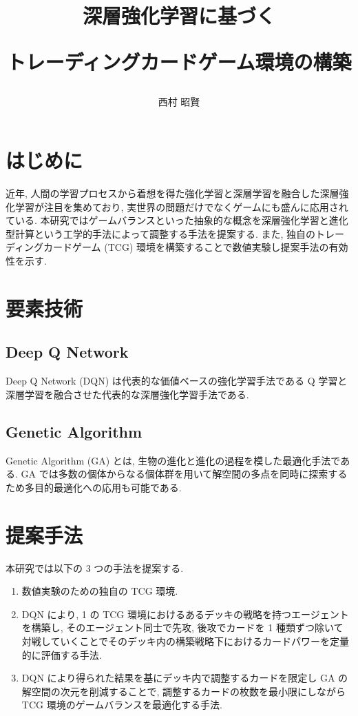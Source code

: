 \documentclass[a4paper,twoside,twocolumn,10pt]{article}
\title{深層強化学習に基づく
\par
トレーディングカードゲーム環境の構築}
\author{西村 昭賢}
\begin{document}
\maketitle %
\small

\section{はじめに}
近年, 人間の学習プロセスから着想を得た強化学習と深層学習を融合した深層強化学習が注目を集めており, 実世界の問題だけでなくゲームにも盛んに応用されている.
本研究ではゲームバランスといった抽象的な概念を深層強化学習と進化型計算という工学的手法によって調整する手法を提案する. また, 独自のトレーディングカードゲーム (TCG) 環境を構築することで数値実験し提案手法の有効性を示す.

\section{要素技術}
\subsection{Deep Q Network}
Deep Q Network (DQN) \cite{DQN} は代表的な価値ベースの強化学習手法である Q 学習と深層学習を融合させた代表的な深層強化学習手法である.

\subsection{Genetic Algorithm}
Genetic Algorithm (GA) とは, 生物の進化と進化の過程を模した最適化手法である. GA では多数の個体からなる個体群を用いて解空間の多点を同時に探索するため多目的最適化への応用も可能である. 
\section{提案手法}
本研究では以下の 3 つの手法を提案する.
\begin{enumerate}
  \setlength{\itemsep}{0cm} %
  \item 数値実験のための独自の TCG 環境.
  \item DQN により, 1 の TCG 環境におけるあるデッキの戦略を持つエージェントを構築し, そのエージェント同士で先攻, 後攻でカードを 1 種類ずつ除いて対戦していくことでそのデッキ内の構築戦略下におけるカードパワーを定量的に評価する手法.
  \item DQN により得られた結果を基にデッキ内で調整するカードを限定し GA の解空間の次元を削減することで, 調整するカードの枚数を最小限にしながら TCG 環境のゲームバランスを最適化する手法.
\end{enumerate}
\end{document}

